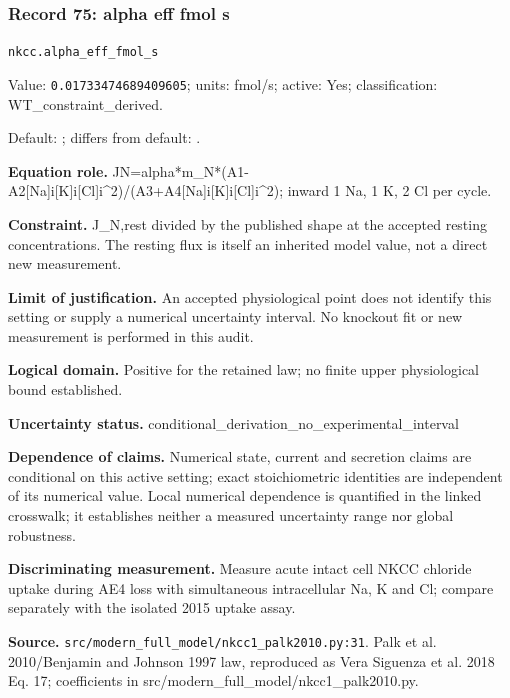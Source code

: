 \subsubsection*{Record 75: alpha eff fmol s}
{\small \nolinkurl{nkcc.alpha_eff_fmol_s}\par

Value: \texttt{0.01733474689409605}; units: fmol/s; active: Yes; classification: WT\_constraint\_derived.\par

Default: ; differs from default: .\par

\textbf{Equation role.} JN=alpha*m\_N*(A1-A2[Na]i[K]i[Cl]i\textasciicircum{}2)/(A3+A4[Na]i[K]i[Cl]i\textasciicircum{}2); inward 1 Na, 1 K, 2 Cl per cycle.\par

\textbf{Constraint.} J\_N,rest divided by the published shape at the accepted resting concentrations. The resting flux is itself an inherited model value, not a direct new measurement.\par

\textbf{Limit of justification.} An accepted physiological point does not identify this setting or supply a numerical uncertainty interval. No knockout fit or new measurement is performed in this audit.\par

\textbf{Logical domain.} Positive for the retained law; no finite upper physiological bound established.\par

\textbf{Uncertainty status.} conditional\_derivation\_no\_experimental\_interval\par

\textbf{Dependence of claims.} Numerical state, current and secretion claims are conditional on this active setting; exact stoichiometric identities are independent of its numerical value. Local numerical dependence is quantified in the linked crosswalk; it establishes neither a measured uncertainty range nor global robustness.\par

\textbf{Discriminating measurement.} Measure acute intact cell NKCC chloride uptake during AE4 loss with simultaneous intracellular Na, K and Cl; compare separately with the isolated 2015 uptake assay.\par

\textbf{Source.} \nolinkurl{src/modern_full_model/nkcc1_palk2010.py:31}. Palk et al. 2010/Benjamin and Johnson 1997 law, reproduced as Vera Siguenza et al. 2018 Eq. 17; coefficients in src/modern\_full\_model/nkcc1\_palk2010.py.\par}

